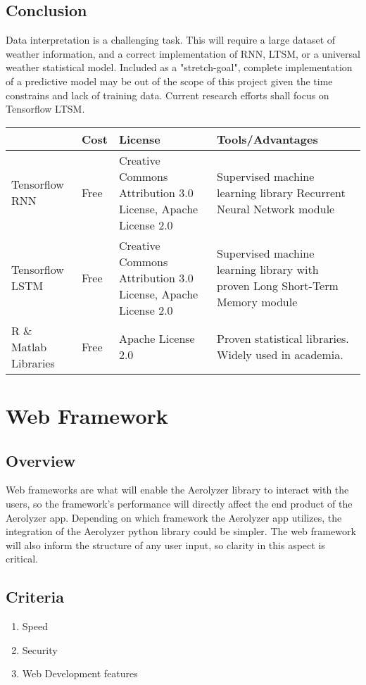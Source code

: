 \documentclass[onecolumn, draftclsnofoot,10pt, compsoc]{IEEEtran}
\begin{document}
\begin{singlespace}
	\subsection{Conclusion}
		Data interpretation is a challenging task.
		This will require a large dataset of weather information, and a correct implementation of RNN, LTSM, or a universal weather statistical model.
		Included as a "stretch-goal", complete implementation of a predictive model may be out of the scope of this project given the time constrains and lack of training data.
		Current research efforts shall focus on Tensorflow LTSM.
		\begin{center}
			\begin{tabular}{|l|p{3cm}|p{5cm}|p{5cm}|}
				\hline \textbf{} & \textbf{Cost} & \textbf{License} & \textbf{Tools/Advantages} \\\hline
				Tensorflow RNN & Free & Creative Commons Attribution 3.0 License, Apache License 2.0 & Supervised machine learning library Recurrent Neural Network module\\\hline
				Tensorflow LSTM& Free & Creative Commons Attribution 3.0 License, Apache License 2.0 & Supervised machine learning library with proven Long Short-Term Memory module\\\hline
				R \& Matlab Libraries & Free & Apache License 2.0 & Proven statistical libraries. Widely used in academia.\\\hline
			\end{tabular}
		\end{center}

\section{Web Framework}
\subsection{Overview}
Web frameworks are what will enable the Aerolyzer library to interact with the users, so the framework's performance will directly affect the end product of the Aerolyzer app. Depending on which framework the Aerolyzer app utilizes, the integration of the Aerolyzer python library could be simpler. The web framework will also inform the structure of any user input, so clarity in this aspect is critical.
\subsection{Criteria}
\begin{enumerate}
	\item Speed
	\item Security
	\item Web Development features
\end{enumerate}

\end{singlespace}
\end{document}
